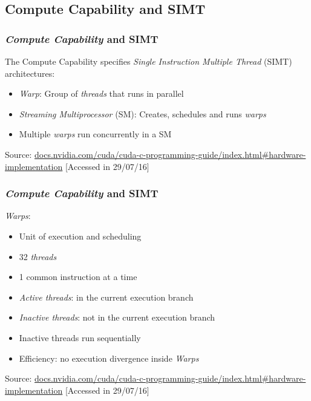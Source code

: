 \documentclass[10pt, compress]{beamer}
\begin{document}
\subsection{Compute Capability and SIMT}

\begin{frame}
    \frametitle{\textit{Compute Capability} and SIMT}
    The \alert{Compute Capability} specifies \textit{Single Instruction
    Multiple Thread} (SIMT) architectures:

    \begin{itemize}
        \item \textit{Warp}: Group of \textit{threads} that runs in \alert{parallel}
        \item \textit{Streaming Multiprocessor} (SM): Creates, schedules and runs \textit{warps}

        \item Multiple \textit{warps} run \alert{concurrently} in a SM
    \end{itemize}
    \vfill

    \begin{center}
        \tiny{Source: \url{docs.nvidia.com/cuda/cuda-c-programming-guide/index.html\#hardware-implementation} [Accessed in 29/07/16]}
    \end{center}
\end{frame}

\begin{frame}
    \frametitle{\textit{Compute Capability} and SIMT}
    \textit{Warps}:

    \begin{itemize}
        \item Unit of execution and scheduling
        \item 32 \textit{threads}

        \item 1 \alert{common instruction} at a time

        \item \textit{Active threads}: in the current execution branch
        \item \textit{Inactive threads}: \alert{not} in the current execution branch

        \item Inactive threads run \alert{sequentially}

        \item Efficiency: no execution divergence inside \textit{Warps}
    \end{itemize}
    \vfill

    \begin{center}
        \tiny{Source: \url{docs.nvidia.com/cuda/cuda-c-programming-guide/index.html\#hardware-implementation} [Accessed in 29/07/16]}
    \end{center}
\end{frame}
\end{document}
